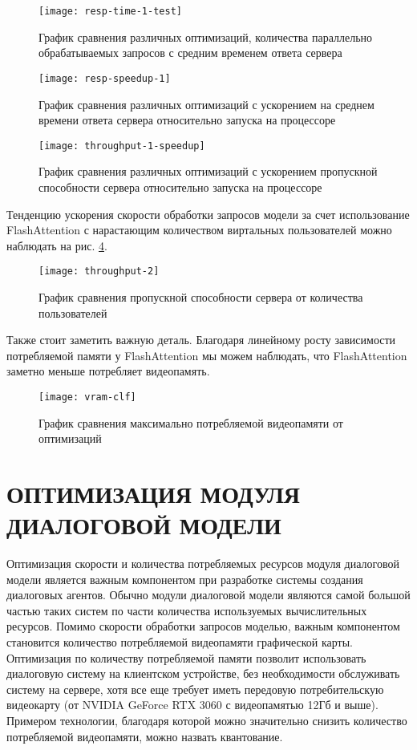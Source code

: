 \begin{figure}[H]
    \centering
    \texttt{[image: resp-time-1-test]}
    \caption{График сравнения различных оптимизаций, количества параллельно обрабатываемых запросов с средним временем ответа сервера}
    \label{resp-time-1}
\end{figure}

\begin{figure}[H]
    \centering
    \texttt{[image: resp-speedup-1]}
    \caption{ График сравнения различных оптимизаций с ускорением на среднем времени ответа сервера относительно запуска на процессоре}
    \label{resp-time-1-speedup}
\end{figure}

\begin{figure}[H]
    \centering
    \texttt{[image: throughput-1-speedup]}
    \caption{График сравнения различных оптимизаций с ускорением пропускной способности сервера относительно запуска на процессоре}
    \label{throughput-1-speedup}
\end{figure}

Тенденцию ускорения скорости обработки запросов модели за счет использование FlashAttention с нарастающим количеством виртальных пользователей можно наблюдать на рис. \ref{throughput-2}.

\begin{figure}[H]
    \centering
    \texttt{[image: throughput-2]}
    \caption{График сравнения пропускной способности сервера от количества пользователей}
    \label{throughput-2}
\end{figure}

Также стоит заметить важную деталь. Благодаря линейному росту зависимости потребляемой памяти у FlashAttention мы можем наблюдать, что FlashAttention заметно меньше потребляет видеопамять.

\begin{figure}[H]
    \centering
    \texttt{[image: vram-clf]}
    \caption{График сравнения максимально потребляемой видеопамяти от оптимизаций}
    \label{vram-clf}
\end{figure}

\section{ОПТИМИЗАЦИЯ МОДУЛЯ ДИАЛОГОВОЙ МОДЕЛИ}
Оптимизация скорости и количества потребляемых ресурсов модуля диалоговой модели является важным компонентом при разработке системы создания диалоговых агентов. Обычно модули диалоговой модели являются самой большой частью таких систем по части количества используемых вычислительных ресурсов. Помимо скорости обработки запросов моделью, важным компонентом становится количество потребляемой видеопамяти графической карты. Оптимизация по количеству потребляемой памяти позволит использовать диалоговую систему на клиентском устройстве, без необходимости обслуживать систему на сервере, хотя все еще требует иметь передовую потребительскую видеокарту (от NVIDIA GeForce RTX 3060 с видеопамятью 12Гб и выше). Примером технологии, благодаря которой можно значительно снизить количество потребляемой видеопамяти, можно назвать квантование.

